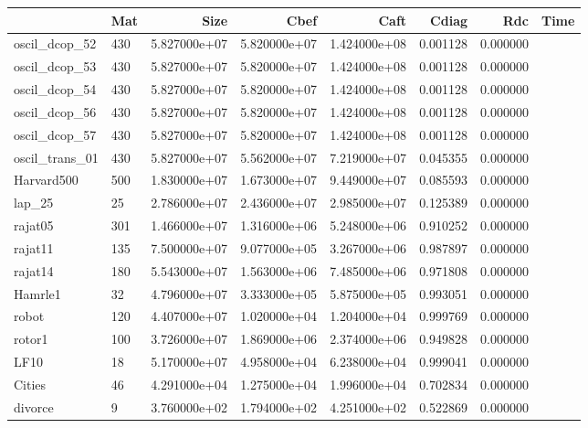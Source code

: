 \begin{tabular}{llrrrrrr}
\toprule
{} &                      Mat &  Size &          Cbef &          Caft &         Cdiag &       Rdc &  Time \\
\midrule
oscil\_dcop\_52           &  430 &  5.827000e+07 &  5.820000e+07 &  1.424000e+08 &  0.001128 &  0.000000 \\
oscil\_dcop\_53           &  430 &  5.827000e+07 &  5.820000e+07 &  1.424000e+08 &  0.001128 &  0.000000 \\
oscil\_dcop\_54           &  430 &  5.827000e+07 &  5.820000e+07 &  1.424000e+08 &  0.001128 &  0.000000 \\
oscil\_dcop\_56           &  430 &  5.827000e+07 &  5.820000e+07 &  1.424000e+08 &  0.001128 &  0.000000 \\
oscil\_dcop\_57           &  430 &  5.827000e+07 &  5.820000e+07 &  1.424000e+08 &  0.001128 &  0.000000 \\
oscil\_trans\_01          &  430 &  5.827000e+07 &  5.562000e+07 &  7.219000e+07 &  0.045355 &  0.000000 \\
Harvard500              &  500 &  1.830000e+07 &  1.673000e+07 &  9.449000e+07 &  0.085593 &  0.000000 \\
lap\_25                  &   25 &  2.786000e+07 &  2.436000e+07 &  2.985000e+07 &  0.125389 &  0.000000 \\
rajat05                 &  301 &  1.466000e+07 &  1.316000e+06 &  5.248000e+06 &  0.910252 &  0.000000 \\
rajat11                 &  135 &  7.500000e+07 &  9.077000e+05 &  3.267000e+06 &  0.987897 &  0.000000 \\
rajat14                 &  180 &  5.543000e+07 &  1.563000e+06 &  7.485000e+06 &  0.971808 &  0.000000 \\
Hamrle1                 &   32 &  4.796000e+07 &  3.333000e+05 &  5.875000e+05 &  0.993051 &  0.000000 \\
robot                   &  120 &  4.407000e+07 &  1.020000e+04 &  1.204000e+04 &  0.999769 &  0.000000 \\
rotor1                  &  100 &  3.726000e+07 &  1.869000e+06 &  2.374000e+06 &  0.949828 &  0.000000 \\
LF10                    &   18 &  5.170000e+07 &  4.958000e+04 &  6.238000e+04 &  0.999041 &  0.000000 \\
Cities                  &   46 &  4.291000e+04 &  1.275000e+04 &  1.996000e+04 &  0.702834 &  0.000000 \\
divorce                 &    9 &  3.760000e+02 &  1.794000e+02 &  4.251000e+02 &  0.522869 &  0.000000 \\

\end{tabular}
